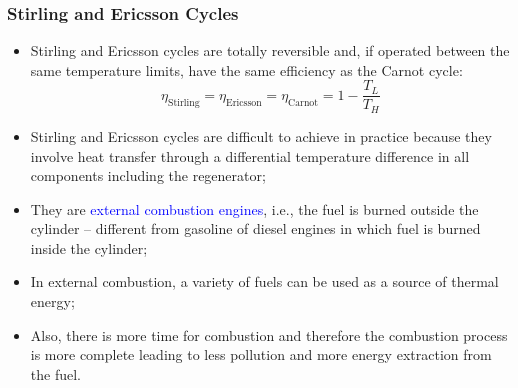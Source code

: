 \documentclass[10pt,compress]{beamer}
\newcommand{\frc}{\displaystyle\frac}
\begin{document}
\begin{frame}
 \frametitle{Stirling and Ericsson Cycles}
    \begin{itemize}
     \item <1-> Stirling and Ericsson cycles are totally reversible and, if operated between the same temperature limits, have the same efficiency as the Carnot cycle:
      \begin{displaymath}
       \eta_{\text{Stirling}}=\eta_{\text{Ericsson}}=\eta_{\text{Carnot}}=1-\frc{T_{L}}{T_{H}}
      \end{displaymath}
     \item <2-> Stirling and Ericsson cycles are difficult to achieve in practice because they involve heat transfer through a differential temperature difference in all components including the regenerator;
     \item <3-> They are \textcolor{blue}{external combustion engines}, i.e., the fuel is burned outside the cylinder -- different from gasoline of diesel engines in which fuel is burned inside the cylinder;
     \item <4-> In external combustion, a variety of fuels can be used as a source of thermal energy;
     \item <5-> Also, there is more time for combustion and therefore the combustion process is more complete leading to less pollution and more energy extraction from the fuel.
  \end{itemize}
\end{frame}
\end{document}
